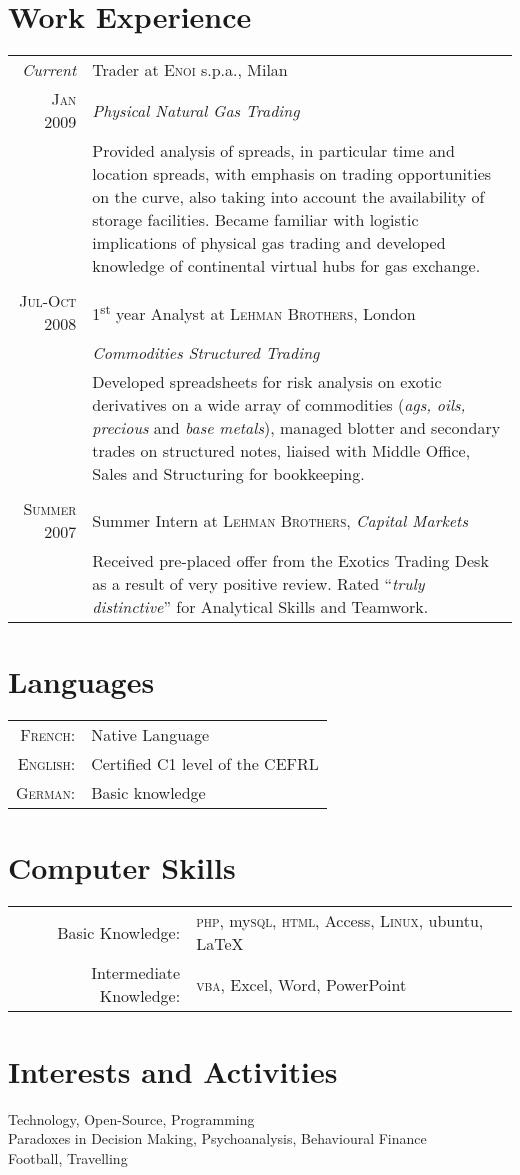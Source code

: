 \documentclass[a4paper,10pt]{article}
\begin{document}
\section{Work Experience}
\begin{tabular}{r|p{11cm}}
	\emph{Current} & Trader at \textsc{Enoi} s.p.a., Milan \\\textsc{Jan 2009}&\emph{Physical Natural Gas Trading}\\&\footnotesize{Provided analysis of spreads, in particular time and location spreads, with emphasis on trading opportunities on the curve, also taking into account the availability of storage facilities. Became familiar with logistic implications of physical gas trading and developed knowledge of continental virtual hubs for gas exchange.}\\\multicolumn{2}{c}{} \\
	\textsc{Jul-Oct 2008} & 1\textsuperscript{st} year Analyst at \textsc{Lehman Brothers}, London \\&\emph{Commodities Structured Trading}\\&\footnotesize{Developed spreadsheets for risk analysis on exotic derivatives on a wide array of commodities (\textit{ags, oils, precious} and \textit{base metals}), managed blotter and secondary trades on structured notes, liaised with Middle Office, Sales and Structuring for bookkeeping.}\\\multicolumn{2}{c}{} \\
	\textsc{Summer 2007} & Summer Intern at \textsc{Lehman Brothers}, \emph{Capital Markets}\\&\footnotesize{Received pre-placed offer from the Exotics Trading Desk as a result of very positive review. Rated ``\emph{truly distinctive}'' for Analytical Skills and Teamwork.}
\end{tabular}

\section{Languages}
\begin{tabular}{rl}
	\textsc{French:}&Native Language\\
	\textsc{English:}&Certified C1 level of the CEFRL\\
	\textsc{German:}&Basic knowledge
\end{tabular}

\section{Computer Skills}
\begin{tabular}{rl}
	Basic Knowledge:& \textsc{php}, my\textsc{sql}, \textsc{html}, Access, \textsc{Linux}, ubuntu, {\fb \LaTeX}\setmainfont[Path = /usr/share/fonts/Fontin/,SmallCapsFont=Fontin-SmallCaps.otf]{Fontin.otf}\\
	Intermediate Knowledge:& \textsc{vba}, Excel, Word, PowerPoint\\
\end{tabular}

\section{Interests and Activities}
Technology, Open-Source, Programming\\
Paradoxes in Decision Making, Psychoanalysis, Behavioural Finance\\
Football, Travelling
\end{document}
